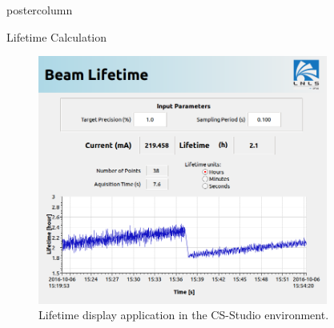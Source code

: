 \documentclass{beamer}
\begin{document}
\begin{frame}
\begin{columns}
\begin{column}{.55\textwidth}
\begin{beamercolorbox}[center]{postercolumn}
\begin{minipage}{.98\textwidth}
{\begin{myblock}{Lifetime Calculation}
\begin{figure}
							\includegraphics[width=0.85\textwidth]{../WEPOPRPO22f2.png}
							\caption{Lifetime display application in the CS-Studio environment.}
						\end{figure}
					\end{myblock}\vfill
		}\end{minipage}\end{beamercolorbox}
	\end{column}
\end{columns}
\end{frame}
\end{document}
